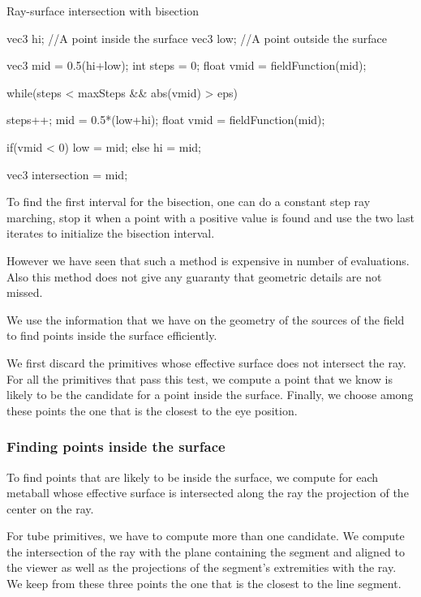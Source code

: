 \documentclass[annual]{acmsiggraph}
\begin{document}
\begin{algorithm}                      %
\caption{Ray-surface intersection with bisection}          %
\label{bisct}                           %
\begin{minipage}{0.9\textwidth}%
\CPP
vec3 hi; //A point inside the surface
vec3 low; //A point outside the surface

vec3 mid = 0.5(hi+low);
int steps = 0;
float vmid = fieldFunction(mid);

while(steps < maxSteps && abs(vmid) > eps)
{
	steps++;
	mid = 0.5*(low+hi);
	float vmid = fieldFunction(mid);
	
	if(vmid < 0)
		low = mid;
	else
		hi = mid;
}	
vec3 intersection = mid;

\END\PROGc{}

\end{minipage}%
\end{algorithm}


To find the first interval for the bisection, one can do a constant step ray marching, stop it when a point with a positive value is found and use the two last iterates to initialize the bisection interval.

However we have seen that such a method is expensive in number of evaluations.
Also this method does not give any guaranty that geometric details are not missed.

We use the information that we have on the geometry of the sources of the field to find points inside the surface efficiently.

We first discard the primitives whose effective surface does not intersect the ray.
For all the primitives that pass this test, we compute a point that we know is likely to be the candidate for a point inside the surface. Finally, we choose among these points the one that is the closest to the eye position.

\subsubsection{Finding points inside the surface}

To find points that are likely to be inside the surface, we compute for each metaball whose effective surface is intersected along the ray the projection of the center on the ray.

For tube primitives, we have to compute more than one candidate. We compute the intersection of the ray with the plane containing the segment and aligned to the viewer as well as the projections of the segment's extremities with the ray. We keep from these three points the one that is the closest to the line segment.
\end{document}
